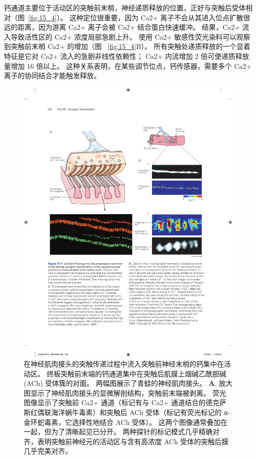 钙通道主要位于活动区的突触前末梢，神经递质释放的位置，正好与突触后受体相对（图~\ref{fig:15_4}）。 
这种定位很重要，因为 Ca2+ 离子不会从其进入位点扩散很远的距离，因为游离 Ca2+ 离子会被 Ca2+ 结合蛋白快速缓冲。 
结果，Ca2+ 流入导致活性区的 Ca2+ 浓度局部急剧上升。 
使用 Ca2+ 敏感性荧光染料可以观察到突触前末梢 Ca2+ 的增加（图 ~\ref{fig:15_4}B）。
所有突触处递质释放的一个显着特征是它对 Ca2+ 流入的急剧非线性依赖性；
Ca2+ 内流增加 2 倍可使递质释放量增加 16 倍以上。 
这种关系表明，在某些调节位点，钙传感器，需要多个 Ca2+ 离子的协同结合才能触发释放。


\begin{figure}[htbp]
	\centering
	\includegraphics[width=0.9\linewidth]{chap15/fig_15_4}
	\caption{在神经肌肉接头的突触传递过程中流入突触前神经末梢的钙集中在活动区。
	终板突触前末端的钙通道集中在突触后肌膜上烟碱乙酰胆碱 (ACh) 受体簇的对面。
	两幅图展示了青蛙的神经肌肉接头。
	\textbf{A}. 放大图显示了神经肌肉接头的显微解剖结构，突触前末端被剥离。
	荧光图像显示了突触前 Ca2+ 通道（标记有与 Ca2+ 通道结合的德克萨斯红偶联海洋蜗牛毒素）和突触后 ACh 受体（标记有荧光标记的 α-金环蛇毒素，它选择性地结合 ACh 受体）。
	这两个图像通常叠加在一起，但为了清晰起见已分开。
	两种探针的标记模式几乎精确对齐，表明突触前神经元的活动区与含有高浓度 ACh 受体的突触后膜几乎完美对齐\cite{robitaille1990strategic}。
}
\end{figure}
